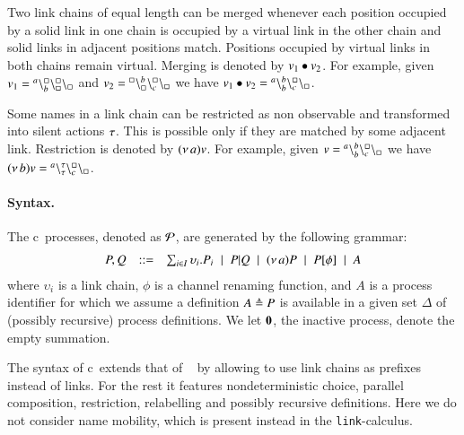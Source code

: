 Two link chains of equal length can be merged whenever each position occupied by a solid link in one chain is occupied by a virtual link in the other chain and solid links in adjacent positions match. Positions occupied by virtual links in both chains remain virtual. Merging is denoted by $v_1 \bullet v_2$.
%
For example, given $v_1 = {}^{a}\backslash_{b}^{\scriptstyle {\square}}\backslash_{\scriptstyle {\square}}^{\scriptstyle {\square}}\backslash_{\scriptstyle {\square}}$ and $v_2 = {}^{\scriptstyle {\square}}\backslash_{\scriptstyle {\square}}^{b}\backslash_{c}^{\scriptstyle {\square}}\backslash_{\scriptstyle {\square}}$ we have $v_1 \bullet v_2 = {}^{a}\backslash_{b}^{b}\backslash_{c}^{\scriptstyle {\square}}\backslash_{\scriptstyle {\square}}$.

Some names in a link chain can be restricted as non observable and transformed into silent actions $\tau$. This is possible only if they are matched by some adjacent link. Restriction is denoted by $(\nu\, a)v$.
%
For example, given $v = {}^{a}\backslash_{b}^{b}\backslash_{c}^{\scriptstyle {\square}}\backslash_{\scriptstyle {\square}}$ we have 
$(\nu\, b)v = {}^{a}\backslash_{\tau}^{\tau}\backslash_{c}^{\scriptstyle {\square}}\backslash_{\scriptstyle {\square}}$.

\paragraph{Syntax.}
The c\CNA\ processes, denoted as $\cal{P}$, are generated by the following grammar:
\[
\begin{array}{rcl}
P,Q & ::= &
\sum_{i\in I} \upsilon_i.P_i \;\mid\;
P|Q \;\mid\;
(\nu\, a) P \;\mid\;
P[\phi] \;\mid\;
A
\end{array}
\]
\noindent
where $\upsilon_i$ is a  link chain,
$\phi$ is a channel renaming function,
and $A$ is a process identifier for which we assume a definition $A
\triangleq P$ is available in a given set $\Delta$ of (possibly
recursive) process definitions. We let $\mathbf{0}$, the inactive process,
denote the empty summation.

The syntax of c\CNA\  extends that of \CNA~\cite{BBB17} by allowing to use link chains as prefixes instead of links.
For the rest it features nondeterministic choice, parallel composition, restriction, relabelling and possibly recursive definitions. Here we do not consider name mobility, which is present instead in the {\tt link}-calculus.
